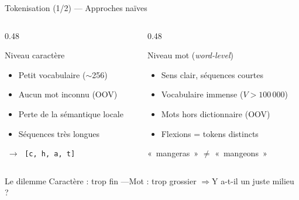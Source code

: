 \documentclass[aspectratio=169, 10pt]{beamer}
\begin{document}
\begin{frame}{Tokenisation (1/2) --- Approches naïves}
  \begin{columns}[T]
    \begin{column}{0.48\textwidth}
      \begin{block}{Niveau caractère}
        \begin{itemize}
          \item[\textcolor{jedy_example}{$+$}] Petit vocabulaire ($\sim$256)
          \item[\textcolor{jedy_example}{$+$}] Aucun mot inconnu (OOV)
          \item[\textcolor{jedy_alert}{$-$}] Perte de la sémantique locale
          \item[\textcolor{jedy_alert}{$-$}] Séquences très longues
        \end{itemize}
        \smallskip
         $\;\to\;$ \texttt{\small[c, h, a, t]}
      \end{block}
    \end{column}
    \begin{column}{0.48\textwidth}
      \begin{block}{Niveau mot (\textit{word-level})}
        \begin{itemize}
          \item[\textcolor{jedy_example}{$+$}] Sens clair, séquences courtes
          \item[\textcolor{jedy_alert}{$-$}] Vocabulaire immense ($V > 100\,000$)
          \item[\textcolor{jedy_alert}{$-$}] Mots hors dictionnaire (OOV)
          \item[\textcolor{jedy_alert}{$-$}] Flexions = tokens distincts
        \end{itemize}
        \smallskip
        «~mangeras~» $\ne$ «~mangeons~»
      \end{block}
    \end{column}
  \end{columns}
  \bigskip
  \begin{alertblock}{Le dilemme}
    Caractère : trop fin \quad---\quad Mot : trop grossier
    \quad$\Rightarrow$\quad Y a-t-il un juste milieu ?
  \end{alertblock}
\end{frame}
\end{document}
